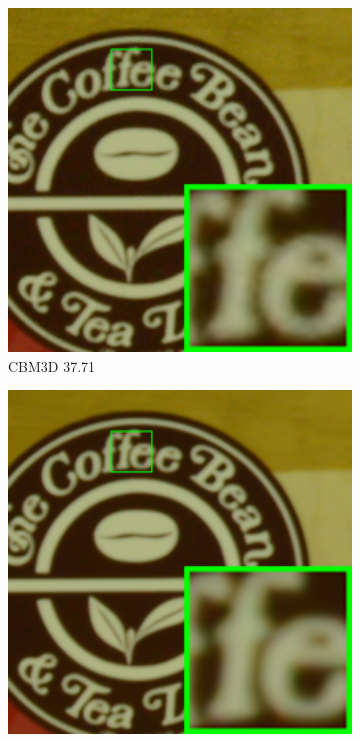 \begin{figure}
\begin{subfigure}[t]{0.19\textwidth}
        \includegraphics[width=1\textwidth]{images/guided/cc60/resize_br_CBM3D_CC_Noisy_Nikon_D800_ISO_1600_B2_109.png}
		\caption{CBM3D 37.71}
    \end{subfigure}
    \hfill
    \begin{subfigure}[t]{0.19\textwidth}
        \centering
        \includegraphics[width=1\textwidth]{images/guided/cc60/resize_br_WNNM_CC_Noisy_Nikon_D800_ISO_1600_B2_109.png}

\end{subfigure}
\end{figure}
